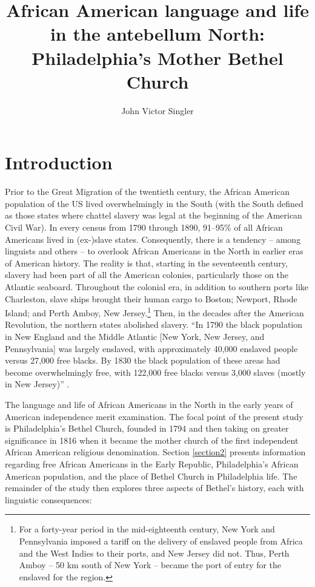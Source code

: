 \documentclass[output=paper,colorlinks,citecolor=brown]{langscibook}
\author{John Victor Singler\affiliation{New York University}}
\title[African American language and life in the antebellum North]{African American language and life in the antebellum North:  Philadelphia’s Mother Bethel Church}
\begin{document}
\maketitle 

\section{Introduction}
Prior to the Great Migration of the twentieth century, the African American population of the US lived overwhelmingly in the South (with the South defined as those states where chattel slavery was legal at the beginning of the American Civil War). In every census from 1790 through 1890, 91--95\% of all African Americans lived in (ex-)slave states. Consequently, there is a tendency -- among linguists and others -- to overlook African Americans in the North in earlier eras of American history. The reality is that, starting in the seventeenth century, slavery had been part of all the American colonies, particularly those on the Atlantic seaboard. Throughout the colonial era, in addition to southern ports like Charleston, slave ships brought their human cargo to Boston; Newport, Rhode Island; and Perth Amboy, New Jersey.\footnote{{For a forty-year period in the mid-eighteenth century, New York and Pennsylvania imposed a tariff on the delivery of enslaved people from Africa and the West Indies to their ports, and New Jersey did not. Thus, Perth Amboy -- 50 km south of New York -- became the port of entry for the enslaved for the region.}} Then, in the decades after the American Revolution, the northern states abolished slavery. “In 1790 the black population in New England and the Middle Atlantic [New York, New Jersey, and Pennsylvania] was largely enslaved, with approximately 40,000 enslaved people versus 27,000 free blacks. By 1830 the black population of these areas had become overwhelmingly free, with 122,000 free blacks versus 3,000 slaves (mostly in New Jersey)” \citep[5]{Newman2008}.

The language and life of African Americans in the North in the early years of American independence merit examination. The focal point of the present study is Philadelphia’s Bethel Church, founded in 1794 and then taking on greater significance in 1816 when it became the mother church of the first independent African American religious denomination. Section \ref{section2} presents information regarding free African Americans in the Early Republic, Philadelphia’s African American population, and the place of Bethel Church in Philadelphia life. The remainder of the study then explores three aspects of Bethel’s history, each with linguistic consequences:
\end{document}
